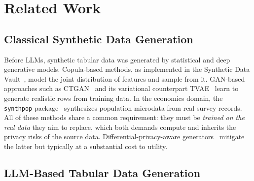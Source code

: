 \documentclass[11pt]{article}
\begin{document}
\section{Related Work}
\label{sec:related}

\subsection{Classical Synthetic Data Generation}

Before LLMs, synthetic tabular data was generated by statistical and deep generative models.
Copula-based methods, as implemented in the Synthetic Data Vault~\cite{patki2016synthpop}, model the joint distribution of features and sample from it.
GAN-based approaches such as CTGAN~\cite{xu2019ctgan} and its variational counterpart TVAE~\cite{xu2019tve} learn to generate realistic rows from training data.
In the economics domain, the \texttt{synthpop} package~\cite{nowok2016synthpop} synthesizes population microdata from real survey records.
All of these methods share a common requirement: they must be \emph{trained on the real data} they aim to replace, which both demands compute and inherits the privacy risks of the source data.
Differential-privacy-aware generators~\cite{tao2024benchmarking} mitigate the latter but typically at a substantial cost to utility.

\subsection{LLM-Based Tabular Data Generation}
\end{document}
